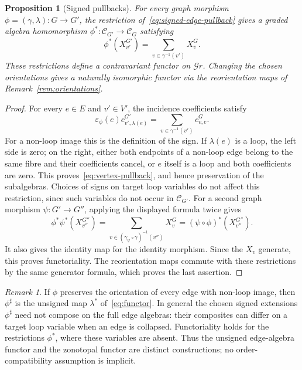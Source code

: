 \documentclass[reqno]{article}
\theoremstyle{plain} %
\newtheorem{proposition}[theorem]{Proposition}
\theoremstyle{definition}
\theoremstyle{remark}
\newtheorem{remark}[theorem]{\sc Remark}
\newcommand {\CC}{\mathscr{C}}
\newcommand{\cG} {\mathscr{G}r}
\numberwithin{equation}{section}
\begin{document}
\begin{proposition}[Signed pullbacks]\label{prop:graph-functor}
For every graph morphism $\phi=(\gamma,\lambda):G\to G'$, the restriction
of~\eqref{eq:signed-edge-pullback} gives a graded algebra homomorphism
$\phi^*:\CC_{G'}\to\CC_G$ satisfying
\begin{equation}\label{eq:vertex-pullback}
\phi^*(X_{v'}^{G'})=\sum_{v\in\gamma^{-1}(v')}X_v^G.
\end{equation}
These restrictions define a contravariant functor on $\cG$.
Changing the chosen orientations gives a naturally isomorphic functor
via the reorientation maps of Remark~\ref{rem:orientations}.
\end{proposition}
\begin{proof}
For every $e\in E$ and $v'\in V'$, the incidence coefficients satisfy
\[
\varepsilon_\phi(e)c^{G'}_{v',\lambda(e)}
=\sum_{v\in\gamma^{-1}(v')}c^G_{v,e}.
\]
For a non-loop image this is the definition of the sign. If $\lambda(e)$
is a loop, the left side is zero; on the right, either both endpoints
of a non-loop edge belong to the same fibre and their coefficients
cancel, or $e$ itself is a loop and both coefficients are zero.
This proves~\eqref{eq:vertex-pullback}, and hence preservation of the
subalgebras. Choices of signs on target loop variables do not affect
this restriction, since such variables do not occur in $\CC_{G'}$.
For a second graph morphism $\psi:G'\to G''$, applying the displayed
formula twice gives
\[
\phi^*\psi^*(X_{v''}^{G''})
=\sum_{v\in(\gamma_\psi\circ\gamma)^{-1}(v'')}X_v^G
=(\psi\circ\phi)^*(X_{v''}^{G''}).
\]
It also gives the identity map for the identity morphism. Since the
$X_v$ generate, this proves functoriality. The reorientation maps
commute with these restrictions by the same generator formula,
which proves the last assertion.
\end{proof}

\begin{remark}
If $\phi$ preserves the orientation of every edge with non-loop image,
then $\phi^\sharp$ is the unsigned map $\lambda^*$ of~\eqref{eq:functor}.
In general the chosen signed extensions $\phi^\sharp$ need not compose
on the full edge algebras: their composites can differ on a target
loop variable when an edge is collapsed. Functoriality holds for
the restrictions $\phi^*$, where these variables are absent. Thus the
unsigned edge-algebra functor and the zonotopal functor are distinct
constructions; no order-compatibility assumption is implicit.
\end{remark}
\end{document}
